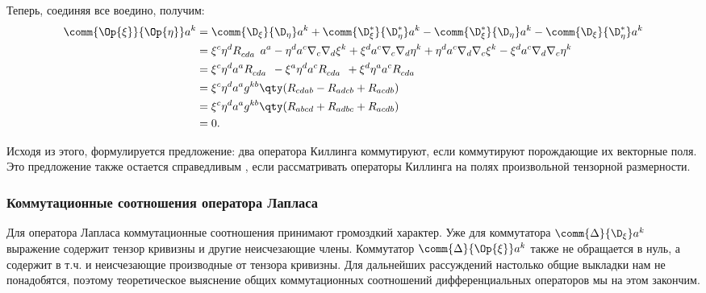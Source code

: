         Теперь, соединяя все воедино, получим:
        \begin{equation}\begin{aligned}
            \comm{\Op{\xi}}{\Op{\eta}} a^k
                &= \comm{\D_\xi}{\D_\eta} a^k
                    + \comm{\D^{*}_\xi}{\D^{*}_\eta} a^k
                    - \comm{\D^{*}_\xi}{\D_\eta} a^k
                    - \comm{\D_\xi}{\D^{*}_\eta} a^k \\
                &= \xi^c \eta^d R_{cda}^{\hphantom{cdak}} a^a
                    - \eta^d a^c \nabla_c \nabla_d \xi^k
                    + \xi^d a^c \nabla_c \nabla_d \eta^k
                    + \eta^d a^c \nabla_d \nabla_c \xi^k
                    - \xi^d a^c \nabla_d \nabla_c \eta^k \\
                &= \xi^c \eta^d a^a R_{cda}^{\hphantom{cdak}}
                    - \xi^a \eta^d a^c R_{cda}^{\hphantom{cdak}}
                    + \xi^d \eta^a a^c R_{cda}^{\hphantom{cdak}} \\
                &= \xi^c \eta^d a^a g^{kb} \qty(
                    R_{cdab} - R_{adcb} + R_{acdb}
                ) \\
                &= \xi^c \eta^d a^a g^{kb} \qty(
                    R_{abcd} + R_{adbc} + R_{acdb}
                ) \\
                &= 0 .
        \end{aligned}\end{equation}

        Исходя из этого, формулируется предложение: два оператора Киллинга коммутируют, если коммутируют порождающие их векторные поля. Это предложение также остается справедливым \cite{burlankov_space_dynamics}, если рассматривать операторы Киллинга на полях произвольной тензорной размерности.


    \subsubsection{Коммутационные соотношения оператора Лапласа}

        Для оператора Лапласа коммутационные соотношения принимают громоздкий характер. Уже для коммутатора $\comm{\Delta}{\D_\xi} a^k$ выражение содержит тензор кривизны и другие неисчезающие члены. Коммутатор $\comm{\Delta}{\Op{\xi}} a^k$ также не обращается в нуль, а содержит в т.ч. и неисчезающие производные от тензора кривизны. Для дальнейших рассуждений настолько общие выкладки нам не понадобятся, поэтому теоретическое выяснение общих коммутационных соотношений дифференциальных операторов мы на этом закончим.

